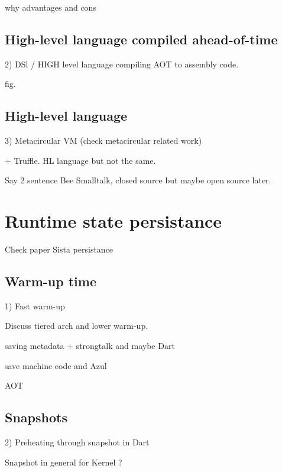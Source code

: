 \documentclass[a4paper,12pt,twoside]{../includes/ThesisStyle}
\begin{document}
why advantages and cons

\subsection{High-level language compiled ahead-of-time}

2) DSl / HIGH level language compiling AOT to assembly code.

fig.


\subsection{High-level language}

3) Metacircular VM (check metacircular related work)

+ Truffle. HL language but not the same.

Say 2 sentence Bee Smalltalk, closed source but maybe open source later.


\section{Runtime state persistance}

Check paper Sista persistance

\subsection{Warm-up time}

1) Fast warm-up

Discuss tiered arch and lower warm-up.

saving metadata + strongtalk and maybe Dart

save machine code and Azul

AOT

\subsection{Snapshots}

2) Preheating through snapshot in Dart

Snapshot in general for Kernel ?

\end{document}
